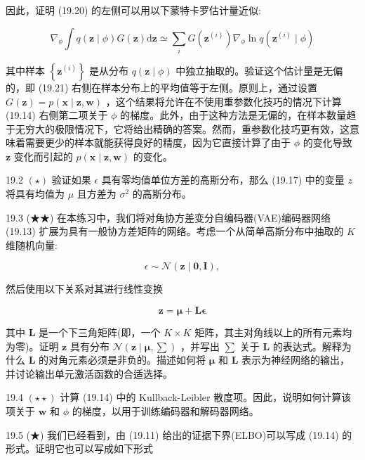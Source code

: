 \documentclass[10pt]{report}
\begin{document}
因此，证明 (19.20) 的左侧可以用以下蒙特卡罗估计量近似:

\[
{\nabla }_{\phi }\int q\left( {\mathbf{z} \mid  \phi }\right) G\left( \mathbf{z}\right) \mathrm{d}\mathbf{z} \simeq  \mathop{\sum }\limits_{i}G\left( {\mathbf{z}}^{\left( i\right) }\right) {\nabla }_{\phi }\ln q\left( {{\mathbf{z}}^{\left( i\right) } \mid  \phi }\right)  \tag{19.21}
\]

其中样本 \(\left\{  {\mathbf{z}}^{\left( i\right) }\right\}\) 是从分布 \(q\left( {\mathbf{z} \mid  \phi }\right)\) 中独立抽取的。验证这个估计量是无偏的，即 (19.21) 右侧在样本分布上的平均值等于左侧。原则上，通过设置 \(G\left( \mathbf{z}\right)  = p\left( {\mathbf{x} \mid  \mathbf{z},\mathbf{w}}\right)\) ，这个结果将允许在不使用重参数化技巧的情况下计算 (19.14) 右侧第二项关于 \(\phi\) 的梯度。此外，由于这种方法是无偏的，在样本数量趋于无穷大的极限情况下，它将给出精确的答案。然而，重参数化技巧更有效，这意味着需要更少的样本就能获得良好的精度，因为它直接计算了由于 \(\phi\) 的变化导致 \(\mathbf{z}\) 变化而引起的 \(p\left( {\mathbf{x} \mid  \mathbf{z},\mathbf{w}}\right)\) 的变化。

19.2 \(\left( \star \right)\) 验证如果 \(\epsilon\) 具有零均值单位方差的高斯分布，那么 (19.17) 中的变量 \(z\) 将具有均值为 \(\mu\) 且方差为 \({\sigma }^{2}\) 的高斯分布。

19.3 (★★) 在本练习中，我们将对角协方差变分自编码器(VAE)编码器网络 (19.13) 扩展为具有一般协方差矩阵的网络。考虑一个从简单高斯分布中抽取的 \(K\) 维随机向量:

\[
\epsilon  \sim  \mathcal{N}\left( {\mathbf{z} \mid  \mathbf{0},\mathbf{I}}\right) , \tag{19.22}
\]

然后使用以下关系对其进行线性变换

\[
\mathbf{z} = \mathbf{\mu } + \mathbf{L}\mathbf{\epsilon } \tag{19.23}
\]

其中 \(\mathbf{L}\) 是一个下三角矩阵(即，一个 \(K \times  K\) 矩阵，其主对角线以上的所有元素均为零)。证明 \(\mathbf{z}\) 具有分布 \(\mathcal{N}\left( {\mathbf{z} \mid  \mathbf{\mu },\mathbf{\sum }}\right)\) ，并写出 \(\mathbf{\sum }\) 关于 \(\mathbf{L}\) 的表达式。解释为什么 \(\mathbf{L}\) 的对角元素必须是非负的。描述如何将 \(\mathbf{\mu }\) 和 \(\mathbf{L}\) 表示为神经网络的输出，并讨论输出单元激活函数的合适选择。

19.4 \(\left( {\star  \star  }\right)\) 计算 (19.14) 中的 Kullback-Leibler 散度项。因此，说明如何计算该项关于 \(\mathbf{w}\) 和 \(\phi\) 的梯度，以用于训练编码器和解码器网络。

19.5 (★) 我们已经看到，由 (19.11) 给出的证据下界(ELBO)可以写成 (19.14) 的形式。证明它也可以写成如下形式
\end{document}
